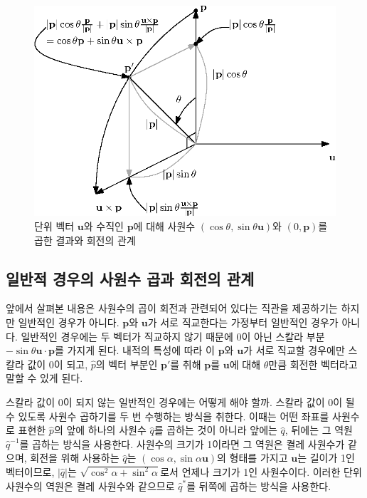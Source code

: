 \begin{figure}[h!]
  \centering
    \includegraphics[width=12cm]{Math_quaternion/quaternionOrtho.eps}
    \caption{단위 벡터 $\mathbf u$와 수직인 $\mathbf p$에 대해 사원수 $(\cos \theta, \sin \theta \mathbf u)$와 $(0, \mathbf p)$를 곱한 결과와 회전의 관계}
    \label{fig:quaternion:quaternionOrtho}
\end{figure}


\subsection{일반적 경우의 사원수 곱과 회전의 관계}

앞에서 살펴본 내용은 사원수의 곱이 회전과 관련되어 있다는 직관을 제공하기는 하지만 일반적인 경우가 아니다.
$\mathbf p$와 $\mathbf u$가 서로 직교한다는 가정부터 일반적인 경우가 아니다.
일반적인 경우에는 두 벡터가 직교하지 않기 때문에 0이 아닌 스칼라 부분 $-\sin \theta \mathbf u \cdot \mathbf p$를 가지게 된다.
내적의 특성에 따라 이 $\mathbf p$와 $\mathbf u$가 서로 직교할 경우에만 스칼라 값이 0이 되고, 
$\hat p$의 벡터 부분인 $\mathbf p'$를 취해 $\mathbf p$를 $\mathbf u$에 대해 $\theta$만큼 회전한 벡터라고 말할 수 있게 된다.

스칼라 값이 0이 되지 않는 일반적인 경우에는 어떻게 해야 할까.
스칼라 값이 0이 될 수 있도록 사원수 곱하기를 두 번 수행하는 방식을 취한다.
이때는 어떤 좌표를 사원수로 표현한 $\hat p$의 앞에 하나의 사원수 $\hat q$를 곱하는 것이 아니라
앞에는 $\hat q$, 뒤에는 그 역원 $\hat q^{-1}$를 곱하는 방식을 사용한다.
사원수의 크기가 1이라면 그 역원은 켤레 사원수가 같으며,
회전을 위해 사용하는 $\hat q$는 
$(\cos \alpha, \sin \alpha \mathbf u)$의 형태를 가지고
$\mathbf u$는 길이가 1인 벡터이므로,
$|\hat q|$는 $\sqrt{\cos^2 \alpha + \sin^2 \alpha}$로서 언제나 크기가 1인 사원수이다.
이러한 단위 사원수의 역원은 켤레 사원수와 같으므로 $\hat q^*$를 뒤쪽에 곱하는 방식을 사용한다.

